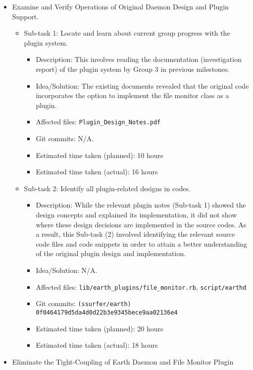 \documentclass{article}
\begin{document}
\begin{itemize}
	\item Examine and Verify Operations of Original Daemon Design and Plugin Support.
		\begin{itemize}
			\item Sub-task 1: Locate and learn about current group progress with the plugin system.
	      	\begin{itemize}
					\item Description: This involves reading the documentation (investigation report) of the plugin system by Group 3 in previous milestones.
					\item Idea/Solution: The existing documents revealed that the original code incorporates the option to implement the file monitor class as a plugin.
					\item Affected files: \texttt{Plugin\_Design\_Notes.pdf}
					\item Git commits: N/A.
					\item Estimated time taken (planned): 10 hours
					\item Estimated time taken (actual): 16 hours
				\end{itemize}
			\item Sub-task 2: Identify all plugin-related designs in codes.
			   \begin{itemize}
					\item Description: While the relevant plugin notes (Sub-task 1) showed the design concepts and explained its implementation, it did not show where these design decisions are implemented in the source codes. As a result, this Sub-task (2) involved identifying the relevant source code files and code snippets in order to attain a better understanding of the original plugin design and implementation. 
					\item Idea/Solution: N/A. 
					\item Affected files: \texttt{lib/earth\_plugins/file\_monitor.rb}, \texttt{script/earthd}
					\item Git commits: \texttt{(ssurfer/earth) 0f0464179d5da4d0d22b3e9345bece9aa02136e4}
					\item Estimated time taken (planned): 20 hours
					\item Estimated time taken (actual): 18 hours
				\end{itemize}
		\end{itemize}
	\item Eliminate the Tight-Coupling of Earth Daemon and File Monitor Plugin
		\begin{itemize}

\end{itemize}
\end{itemize}
\end{document}
